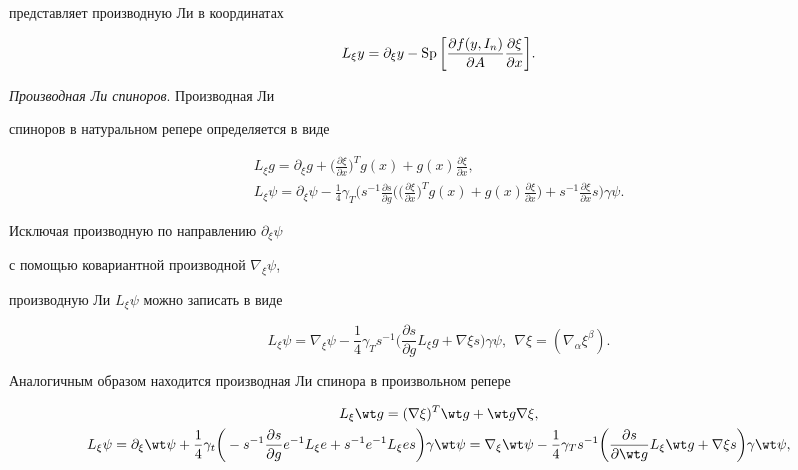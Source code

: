 представляет производную Ли в координатах


$$


L_\xi y=\partial_\xi y-\SP


\bigg[ \frac{\partial f(y,I_n)}{\partial A}\frac{\partial\xi}{\partial x}


\bigg].


$$





{\it Производная Ли спиноров}. Производная Ли


спиноров в натуральном репере определяется в виде


\begin{gather*}


L_\xi g=\partial_\xi g+\bigg(\frac{\partial \xi}{\partial x}\bigg)^Tg(x)+


g(x)\frac{\partial \xi}{\partial x}, \\


%


L_\xi\psi=\partial_\xi\psi-\frac{1}{4}\gamma_T\bigg(s^{-1}


\frac{\partial s}{\partial g}\bigg(\bigg(\frac{\partial \xi}


{\partial x}\bigg)^Tg(x)+


g(x)\frac{\partial \xi}{\partial x}\bigg)+s^{-1}


\frac{\partial \xi}{\partial x}s\bigg)\gamma\psi.


\end{gather*}


Исключая производную по направлению $\partial_\xi\psi$


с помощью ковариантной производной $\nabla_\xi\psi$,


производную Ли $L_\xi\psi$ можно записать в виде


$$


L_\xi\psi=\nabla_\xi\psi


-\frac{1}{4}\gamma_Ts^{-1}\bigg(\frac{\partial s}{\partial g}L_\xi g+


\nabla\xi s\bigg)\gamma\psi,\ \ \nabla\xi=(\nabla_\alpha\xi^\beta).


$$


Аналогичным образом находится производная Ли спинора в произвольном репере


\begin{gather*}


L_\xi \wt g=(\nabla \xi)^T\wt g+\wt g\nabla \xi, \\


%


L_\xi\psi=\partial_\xi\wt\psi+\frac{1}{4}\gamma_t\bigg(


-s^{-1}\frac{\partial s}{\partial g}e^{-1}L_\xi e+s^{-1}e^{-1}L_\xi es\bigg)


\gamma \wt\psi=\nabla_\xi\wt\psi-\frac{1}{4}\gamma_Ts^{-1}\bigg(


\frac{\partial s}{\partial\wt g} L_\xi\wt g+\nabla\xi s\bigg)\gamma\wt\psi,


\end{gather*}


